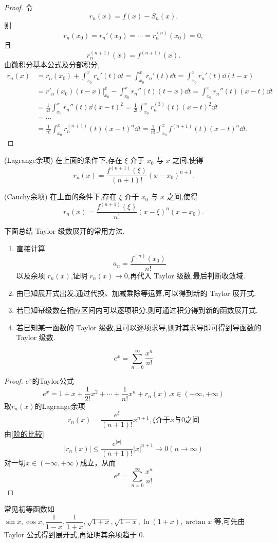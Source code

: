 \begin{proof}
	令
	\[
	r_n(x)=f(x)-S_n(x).
	\]
	则
	\[
	r_n(x_0)=r_n'(x_0)=\cdots=r_n^{(n)}(x_0)=0,
	\]
	且
	\[
	r_n^{(n+1)}(x)=f^{(n+1)}(x).
	\]
	由微积分基本公式及分部积分,
	\[
	\begin{aligned}
		r_n(x)
		&=r_n(x_0)+\int_{x_0}^{x}r_n'(t)\dd t = \int_{x_0}^{x}r_n'(t)\dd t   =  \int_{x_0}^{x}r_n'(t)\dd (t-x)  \\
		&=r'_n(x_0)(t-x)|_{x_0}^{x} -\int_{x_0}^{x}r_n''(t)(t-x)\dd t=\int_{x_0}^{x}r_n''(t)(x-t)\dd t                                  \\
		&=\frac{1}{2!}\int_{x_0}^{x}r_n''(t)\dd (x-t)^2  =\frac{1}{2!}\int_{x_0}^{x}r_n^{(3)}(t)(x-t)^2\dd t                 \\
		&=\cdots \\
		&=\frac{1}{n!}\int_{x_0}^{x}r_n^{(n+1)}(t)(x-t)^n\dd t=\frac{1}{n!}\int_{x_0}^{x}f^{(n+1)}(t)(x-t)^n\dd t.
	\end{aligned}
	\]
\end{proof}

(Lagrange余项)
	在上面的条件下,存在 $\xi$ 介于 $x_0$ 与 $x$ 之间,使得
	\[
	r_n(x)=\frac{f^{(n+1)}(\xi)}{(n+1)!}(x-x_0)^{n+1}.
	\]


(Cauchy余项)
	在上面的条件下,存在 $\xi$ 介于 $x_0$ 与 $x$ 之间,使得
	\[
	r_n(x)=\frac{f^{(n+1)}(\xi)}{n!}(x-\xi)^n(x-x_0).
	\]


下面总结 Taylor 级数展开的常用方法.
\begin{enumerate}
	\item 直接计算
	\[
	a_n=\frac{f^{(n)}(x_0)}{n!}
	\]
	以及余项 $r_n(x)$,证明 $r_n(x)\to0$,再代入 Taylor 级数,最后判断收敛域.
	\item 由已知展开式出发,通过代换、加减乘除等运算,可以得到新的 Taylor 展开式.
	\item 若已知幂级数在相应区间内可以逐项积分,则可通过积分得到新的函数展开式.
	\item 
	若已知某一函数的 Taylor 级数,且可以逐项求导,则对其求导即可得到导函数的 Taylor 级数.
\end{enumerate}
\begin{example}
	$$e^x = \sum_{n=0}^{\infty}\frac{x^n}{n!}$$
\end{example}
\begin{proof}
	$ e^x$的Taylor公式
	\[e^x=1+x+\frac{1}{2!}x^2+\cdots+\frac{1}{n!}x^n+r_n(x).x\in(-\infty,+\infty)\]
	取$r_n(x)$的Lagrange余项
	\[r_n(x)=\frac{e^\xi}{(n+1)!}x^{n+1},\xi\text{介于}x\text{与}0\text{之间}\]
	由\ref{阶的比较}
	\[|r_n(x)|\leqslant \frac{e^{|x|}}{(n+1)!}|x|^{n+1}\to0(n\to\infty)\]
	对一切$x\in(-\infty,+\infty)$成立，从而$$e^x = \sum_{n=0}^{\infty}\frac{x^n}{n!}$$
\end{proof}
常见初等函数如 $\sin x,\cos x,\dfrac{1}{1-x},\dfrac{1}{1+x},\sqrt{1+x},\sqrt{1-x},\ln(1+x),\arctan x$ 等,可先由 Taylor 公式得到展开式,再证明其余项趋于 $0$.


